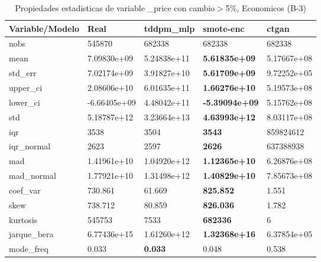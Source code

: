 \begin{table}[H]
\centering
\fontsize{8}{14}\selectfont
\caption{Propiedades estadisticas de variable \_price con cambio\ensuremath{>}5\%, Economicos (B-3)}
\label{table-stats-economicos-b-3-_price-short}
\begin{tabular}{|l|m{10em}|m{10em}|m{10em}|m{10em}|}
\hline
 \rowcolor[gray]{0.8}
Variable/Modelo & Real & tddpm\_mlp & smote-enc & ctgan \\
\hline nobs & 545870 & 682338 & 682338 & 682338 \\
\hline mean & 7.09830e+09 & \cellcolor[rgb]{0.9, 0.54, 0.52} 5.24838e+11 & \bfseries 5.61835e+09 & 5.17667e+08 \\
\hline std\_err & 7.02174e+09 & \cellcolor[rgb]{0.9, 0.54, 0.52} 3.91827e+10 & \bfseries 5.61709e+09 & 9.72252e+05 \\
\hline upper\_ci & 2.08606e+10 & \cellcolor[rgb]{0.9, 0.54, 0.52} 6.01635e+11 & \bfseries 1.66276e+10 & 5.19573e+08 \\
\hline lower\_ci & -6.66405e+09 & \cellcolor[rgb]{0.9, 0.54, 0.52} 4.48042e+11 & \bfseries -5.39094e+09 & 5.15762e+08 \\
\hline std & 5.18787e+12 & \cellcolor[rgb]{0.9, 0.54, 0.52} 3.23664e+13 & \bfseries 4.63993e+12 & 8.03117e+08 \\
\hline iqr & 3538 & 3504 & \bfseries 3543 & \cellcolor[rgb]{0.9, 0.54, 0.52} 859824612 \\
\hline iqr\_normal & 2623 & 2597 & \bfseries 2626 & \cellcolor[rgb]{0.9, 0.54, 0.52} 637388938 \\
\hline mad & 1.41961e+10 & \cellcolor[rgb]{0.9, 0.54, 0.52} 1.04920e+12 & \bfseries 1.12365e+10 & 6.26876e+08 \\
\hline mad\_normal & 1.77921e+10 & \cellcolor[rgb]{0.9, 0.54, 0.52} 1.31498e+12 & \bfseries 1.40829e+10 & 7.85673e+08 \\
\hline coef\_var & 730.861 & 61.669 & \bfseries 825.852 & \cellcolor[rgb]{0.9, 0.54, 0.52} 1.551 \\
\hline skew & 738.712 & 80.859 & \bfseries 826.036 & \cellcolor[rgb]{0.9, 0.54, 0.52} 1.782 \\
\hline kurtosis & 545753 & 7533 & \bfseries 682336 & \cellcolor[rgb]{0.9, 0.54, 0.52} 6 \\
\hline jarque\_bera & 6.77436e+15 & 1.61260e+12 & \bfseries 1.32368e+16 & \cellcolor[rgb]{0.9, 0.54, 0.52} 6.37854e+05 \\
\hline mode\_freq & 0.033 & \bfseries 0.033 & 0.048 & \cellcolor[rgb]{0.9, 0.54, 0.52} 0.538 \\

\end{tabular}
\end{table}
